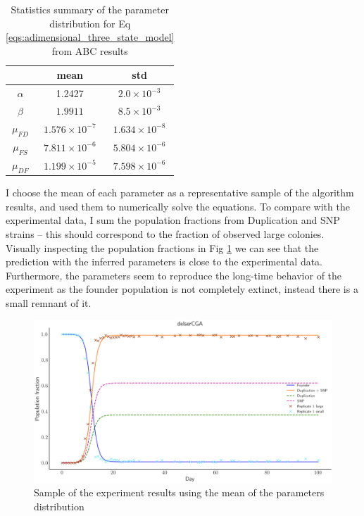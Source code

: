 \documentclass[10pt,a4paper]{scrartcl}
\begin{document}
\begin{table}[H]
    \centering
    \begin{tabular}{c|c|c}
    \hline
    & \textbf{mean} & \textbf{std} \\\hline
     $\alpha$ & 1.2427   & $2.0 \times 10^{-3}$ \\
     $\beta$  & $1.9911$ & $8.5 \times 10^{-3}$\\
     $\mu_{FD}$    & $1.576\times 10^{-7}$ & $1.634\times 10^{-8}$ \\
     $\mu_{FS}$    & $7.811\times 10^{-6}$ & $5.804\times 10^{-6}$ \\
     $\mu_{DF}$    & $1.199\times 10^{-5}$ & $7.598\times 10^{-6}$ \\\hline
    \end{tabular}
    \caption{Statistics summary of the parameter distribution for Eq \ref{eqs:adimensional_three_state_model} from ABC results}
    \label{tab:abc_3st_params}
\end{table}


I choose the mean of each parameter as a representative sample of the algorithm results, and used them to numerically solve the equations. To compare with the experimental data, I sum the population fractions from Duplication and SNP strains -- this should correspond to the fraction of observed large colonies. Visually inspecting the population fractions in Fig \ref{fig:abc_3st_experiment_comparison} we can see that the prediction with the inferred parameters is close to the experimental data. Furthermore, the parameters seem to reproduce the long-time behavior of the experiment as the founder population is not completely extinct, instead there is a small remnant of it.
\begin{figure}[H]
    \centering
    \includegraphics[width=1\linewidth]{plots/abc_3st_experiment_comparison.png}
    \caption{Sample of the experiment results using the mean of the parameters distribution}
    \label{fig:abc_3st_experiment_comparison}
\end{figure}
\end{document}
